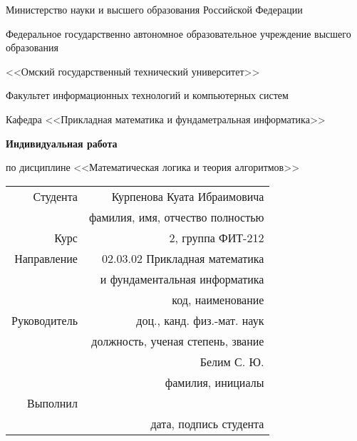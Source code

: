 \documentclass[14pt, a4paper]{article}
\begin{document}
    \thispagestyle{empty}

    \begin{center}
        Министерство науки и высшего образования Российской Федерации

        Федеральное государственно автономное образовательное учреждение высшего образования

        <<Омский государственный технический университет>>

        \vspace{1cm}
        Факультет информационных технологий и компьютерных систем

        Кафедра <<Прикладная математика и фундаметральная информатика>>

        \vspace{3cm}
        \textbf{Индивидуальная работа}

        по дисциплине <<Математическая логика и теория алгоритмов>>
    \end{center}
    
    \vspace{3cm}
    \begin{flushright}    
        \begin{tabular}{ r r }
            Студента & Курпенова Куата Ибраимовича \\
            \cline{2-2}
            & \tiny{фамилия, имя, отчество полностью} \\

            Курс & 2, группа ФИТ-212 \\
            \cline{2-2}
            Направление & 02.03.02 Прикладная математика \\
            \cline{2-2}
            & и фундаментальная информатика \\
            \cline{2-2}
            & \tiny{код, наименование} \\
            
            Руководитель & доц., канд. физ.-мат. наук \\
            \cline{2-2}
            & \tiny{должность, ученая степень, звание} \\
            & Белим С. Ю. \\
            \cline{2-2}
            & \tiny{фамилия, инициалы} \\
            
            Выполнил & \\
            \cline{2-2}
            & \tiny{дата, подпись студента} \\
            
        \end{tabular}
    \end{flushright}
    
\end{document}
